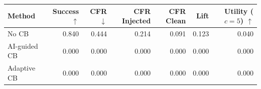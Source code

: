 \begin{tabular}{lrrrrrr}
\toprule
Method & Success $\uparrow$ & CFR $\downarrow$ & CFR Injected & CFR Clean & Lift & Utility ($c=5$) $\uparrow$ \\
\midrule
No CB & 0.840 & 0.444 & 0.214 & 0.091 & 0.123 & 0.040 \\
AI-guided CB & 0.000 & 0.000 & 0.000 & 0.000 & 0.000 & 0.000 \\
Adaptive CB & 0.000 & 0.000 & 0.000 & 0.000 & 0.000 & 0.000 \\
\bottomrule
\end{tabular}
